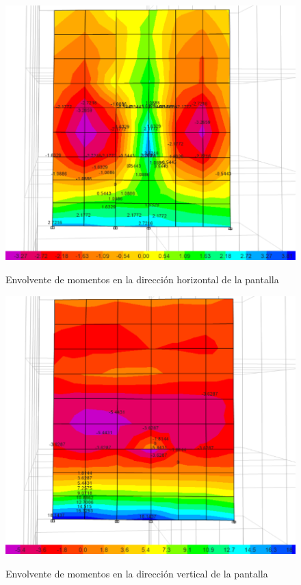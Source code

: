 \begin{figure}[h!]
    \centering
    \caption{Envolvente de momentos en la dirección horizontal de la pantalla}
    \includegraphics[scale=0.55]{IMAGENES/m11.PNG}
    \label{atrans}
\end{figure} 


\begin{figure}[h!]
    \centering
    \caption{Envolvente de momentos en la dirección vertical de la pantalla}
    \includegraphics[scale=0.55]{IMAGENES/m22.PNG}
    \label{atrans}
\end{figure} 